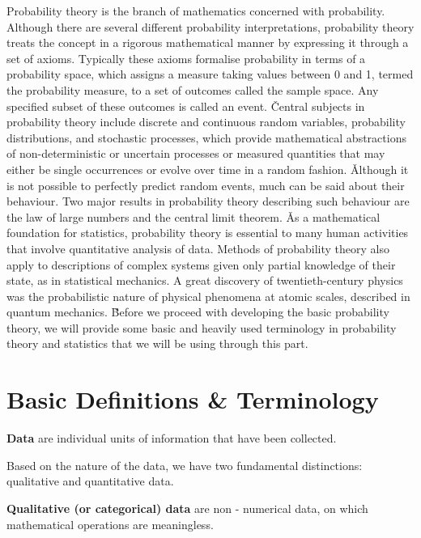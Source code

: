 Probability theory is the branch of mathematics concerned with probability. Although there are several different
probability interpretations, probability theory treats the concept in a rigorous mathematical manner by expressing it
through a set of axioms. Typically these axioms formalise probability in terms of a probability space, which assigns
a measure taking values between 0 and 1, termed the probability measure, to a set of outcomes called the sample space.
Any specified subset of these outcomes is called an event. \v

Central subjects in probability theory include discrete and continuous random variables, probability distributions,
and stochastic processes, which provide mathematical abstractions of non-deterministic or uncertain processes or
measured quantities that may either be single occurrences or evolve over time in a random fashion. \v

Although it is not possible to perfectly predict random events, much can be said about their behaviour. Two major
results in probability theory describing such behaviour are the law of large numbers and the central limit theorem. \v

As a mathematical foundation for statistics, probability theory is essential to many human activities that involve
quantitative analysis of data. Methods of probability theory also apply to descriptions of complex systems given only
partial knowledge of their state, as in statistical mechanics. A great discovery of twentieth-century physics was the
probabilistic nature of physical phenomena at atomic scales, described in quantum mechanics. \v

Before we proceed with developing the basic probability theory, we will provide some basic and heavily used
terminology in probability theory and statistics that we will be using through this part.

\section{Basic Definitions \& Terminology}

\bd[Data]
\textbf{Data} are individual units of information that have been collected.
\ed

Based on the nature of the data, we have two fundamental distinctions: qualitative and quantitative data.

\textbf{Qualitative (or categorical) data} are non - numerical data, on which mathematical operations are meaningless.
\ed

